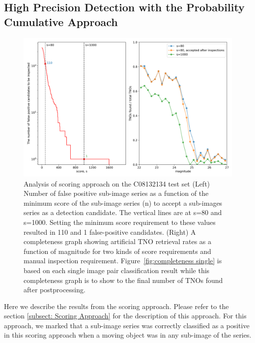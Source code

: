 \documentclass{aastex631}
\begin{document}
\subsection{High Precision Detection with the Probability Cumulative Approach}
\label{subsect: High precision with the Probability Cumulative Approach}

\begin{figure}[ht]
    \centering
    \includegraphics[width=\textwidth,keepaspectratio]{Figures/completeness_with_score.png}
    \caption{Analysis of scoring approach on the C08132134 test set (Left) Number of false positive sub-image series as a function of the minimum score of the sub-image series (n) to accept a sub-images series as a detection candidate.
    The vertical lines are at s=80 and s=1000.
    Setting the minimum score requirement to these values resulted in 110 and 1 false-positive candidates.
    (Right) A completeness graph showing artificial TNO retrieval rates as a function of magnitude for two kinds of score requirements and manual inspection requirement.
    Figure~\ref{fig:completeness single} is based on each single image pair classification result while this completeness graph is to show to the final number of TNOs found after postprocessing.
    }
    \label{fig:completeness with movies}
\end{figure}

Here we describe the results from the scoring approach.
Please refer to the section \ref{subsect: Scoring Approach} for the description of this approach.
For this approach, we marked that a sub-image series was correctly classified as a positive in this scoring approach when a moving object was in any sub-image of the series.
\end{document}

